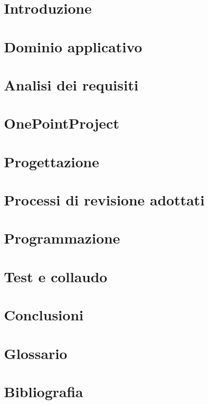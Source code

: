 
%

\def\INDICE		{true} 		%
\def\TABELLE	{true} 		%
\def\FIGURE		{true} 		%




\pagestyle{stilecapitolinumerati}

\section[Introduzione]{Introduzione}

\newpage

\section{Dominio applicativo}

\newpage

\section{Analisi dei requisiti}
\label{sec:analisi}

\newpage

\section{OnePointProject}

\newpage

\section{Progettazione}

\newpage

\section{Processi di revisione adottati}

\newpage

\section{Programmazione}

\newpage

\section{Test e collaudo}

\newpage

\section{Conclusioni}

\newpage

\pagestyle{stilecapitolinonnumerati}

\section*{Glossario}

\newpage

\section*{Bibliografia}

\newpage

